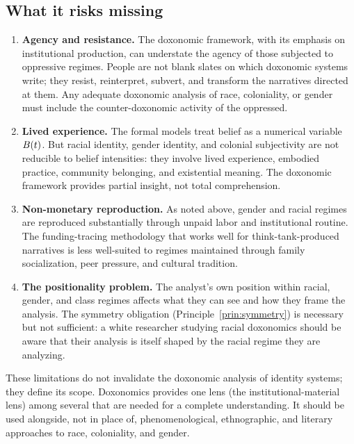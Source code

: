 \subsection{What it risks missing}

\begin{enumerate}
  \item \textbf{Agency and resistance.}
  The doxonomic framework, with its emphasis on institutional production, can understate the agency of those subjected to oppressive regimes.
  People are not blank slates on which doxonomic systems write; they resist, reinterpret, subvert, and transform the narratives directed at them.
  Any adequate doxonomic analysis of race, coloniality, or gender must include the counter-doxonomic activity of the oppressed.

  \item \textbf{Lived experience.}
  The formal models treat belief as a numerical variable $B_{}(t)$.
  But racial identity, gender identity, and colonial subjectivity are not reducible to belief intensities: they involve lived experience, embodied practice, community belonging, and existential meaning.
  The doxonomic framework provides partial insight, not total comprehension.

  \item \textbf{Non-monetary reproduction.}
  As noted above, gender and racial regimes are reproduced substantially through unpaid labor and institutional routine.
  The funding-tracing methodology that works well for think-tank-produced narratives is less well-suited to regimes maintained through family socialization, peer pressure, and cultural tradition.

  \item \textbf{The positionality problem.}
  The analyst's own position within racial, gender, and class regimes affects what they can see and how they frame the analysis.
  The symmetry obligation (Principle~\ref{prin:symmetry}) is necessary but not sufficient: a white researcher studying racial doxonomics should be aware that their analysis is itself shaped by the racial regime they are analyzing.
\end{enumerate}

These limitations do not invalidate the doxonomic analysis of identity systems; they define its scope.
Doxonomics provides one lens (the institutional-material lens) among several that are needed for a complete understanding.
It should be used alongside, not in place of, phenomenological, ethnographic, and literary approaches to race, coloniality, and gender.

